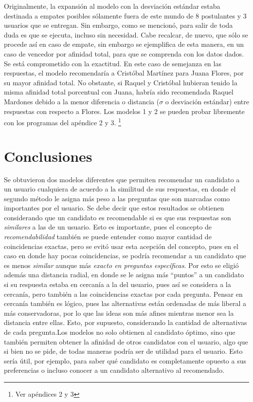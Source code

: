 \documentclass[a4paper]{article}
\begin{document}
Originalmente, la expansión al modelo con la desviación estándar estaba destinada a empates posibles sólamente fuera de este mundo de 8 postulantes y 3 usuarios que se entregan. Sin embargo, como se mencionó, para salir de toda duda es que se ejecuta, incluso sin necesidad. Cabe recalcar, de nuevo, que sólo se procede así en caso de empate, sin embargo se ejemplifica de esta manera, en un caso de vencedor por afinidad total, para que se comprenda con los datos dados. Se está comprometido con la exactitud. En este caso de semejanza en las respuestas, el modelo recomendaría a Cristóbal Martínez para Juana Flores, por su mayor afinidad total. No obstante, si Raquel y Cristóbal hubieran tenido la misma afinidad total porcentual con Juana, habría sido recomendada Raquel Mardones debido a la menor diferencia o distancia ($\sigma$ o desviación estándar) entre respuestas con respecto a Flores. Los modelos 1 y 2 se pueden probar libremente con los programas del apéndice 2 y 3.
\footnote{Ver apéndices 2 y 3}
\section{Conclusiones}
Se obtuvieron dos modelos diferentes que permiten recomendar un candidato a un usuario cualquiera de acuerdo a la similitud de sus respuestas, en donde el segundo método le asigna más peso a las preguntas que son marcadas como importantes por el usuario. Se debe decir que estos resultados se obtienen considerando que un candidato es recomendable si es que sus respuestas son \textit{similares} a las de un usuario. Esto es importante, pues el concepto de \textit{recomendabilidad} también se puede entender como mayor cantidad de coincidencias exactas, pero se evitó usar esta acepción del concepto, pues en el caso en donde hay pocas coincidencias, se podría recomendar a un candidato que es menos \textit{similar} aunque más \textit{exacto en preguntas específicas}. Por esto se eligió además una distancia radial, en donde se le asigna más “puntos” a un candidato si su respuesta estaba en cercanía a la del usuario, pues así se considera a la cercanía, pero también a las coincidencias exactas por cada pregunta. Pensar en cercanía también es lógico, pues las alternativas están ordenadas de más liberal a más conservadoras, por lo que las ideas son más afines mientras menor sea la distancia entre ellas. Esto, por supuesto, considerando la cantidad de alternativas de cada pregunta.\newline\newline Los modelos no solo obtienen al candidato óptimo, sino que también permiten obtener la afinidad de otros candidatos con el usuario, algo que si bien no se pide, de todas maneras podría ser de utilidad para el usuario. Esto sería útil, por ejemplo, para saber qué candidato es completamente opuesto a sus preferencias o incluso conocer a un candidato alternativo al recomendado. 
\newpage
\end{document}

